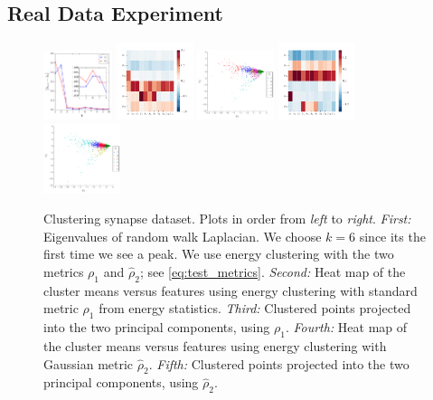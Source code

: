 \documentclass{article}
\begin{document}
\subsection{Real Data Experiment}


\begin{figure}
\includegraphics[width=0.18\textwidth]{eigen_gap.pdf}
\includegraphics[width=0.2\textwidth]{heat_means_k6_energy.pdf}
\includegraphics[width=0.2\textwidth]{synapse_cluster_2d_k6_energy.pdf}
\includegraphics[width=0.2\textwidth]{heat_means_k6_gauss.pdf}
\includegraphics[width=0.2\textwidth]{synapse_cluster_2d_k6_gauss.pdf}
\vspace{-0.8cm}
\caption{\label{fig:synapse}
Clustering synapse dataset.
Plots in order from \emph{left} to \emph{right}.
\emph{First:} Eigenvalues of random walk Laplacian. We choose
$k=6$ since its the first time we see a peak. We use energy clustering
with the two metrics $\rho_1$ and $\widehat{\rho}_2$; see
\eqref{eq:test_metrics}.
\emph{Second:} Heat map of the cluster means versus features
using energy clustering with standard
metric $\rho_1$ from energy statistics.
\emph{Third:} Clustered points projected into the two principal components,
using $\rho_1$.
\emph{Fourth:} Heat map of the cluster means versus features
using energy clustering with Gaussian metric 
$\widehat{\rho}_2$.
\emph{Fifth:} Clustered points projected into the two principal components,
using $\widehat{\rho}_2$.
}
\end{figure}
\end{document}
